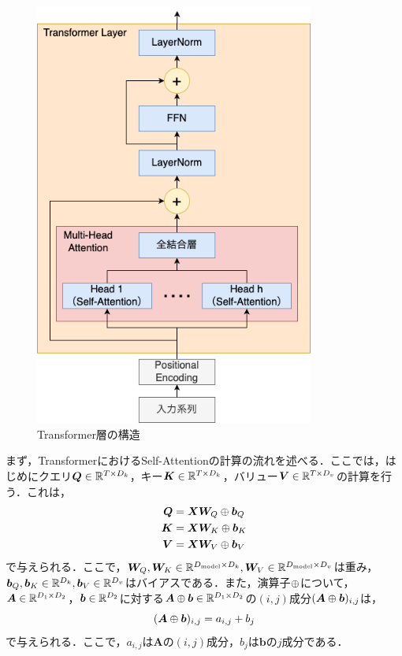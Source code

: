 \documentclass[12pt]{jarticle}
\numberwithin{equation}{section}    %
\numberwithin{figure}{section}      %
\numberwithin{table}{section}      %
\begin{document}
\begin{figure}[bt]
    \centering
    \includegraphics[height=140mm]{./figure/sec3/transformer.drawio.png}
    \caption{Transformer層の構造}
    \label{sec3:fig:transformer_layer}
\end{figure}

まず，TransformerにおけるSelf-Attentionの計算の流れを述べる．ここでは，はじめにクエリ$\bm{Q} \in \mathbb{R}^{T \times D_{k}}$，キー$\bm{K} \in \mathbb{R}^{T \times D_{k}}$，バリュー$\bm{V} \in \mathbb{R}^{T \times D_{v}}$の計算を行う．これは，
\begin{align}
    \bm{Q} & = \bm{X}\bm{W}_{Q} \oplus \bm{b}_{Q} \\
    \bm{K} & = \bm{X}\bm{W}_{K} \oplus \bm{b}_{K} \\
    \bm{V} & = \bm{X}\bm{W}_{V} \oplus \bm{b}_{V}
\end{align}
で与えられる．ここで，$\bm{W}_{Q}, \bm{W}_{K} \in \mathbb{R}^{D_{\text{model}} \times D_{k}}, \bm{W}_{V} \in \mathbb{R}^{D_{\text{model}} \times D_{v}}$は重み，$\bm{b}_{Q}, \bm{b}_{K} \in \mathbb{R}^{D_{k}}, \bm{b}_{V} \in \mathbb{R}^{D_{v}}$はバイアスである．また，演算子$\oplus$について，$\bm{A} \in \mathbb{R}^{D_{1} \times D_{2}}$，$\bm{b} \in \mathbb{R}^{D_{2}}$に対する$\bm{A} \oplus \bm{b} \in \mathbb{R}^{D_{1} \times D_{2}}$の$(i, j)$成分$(\bm{A} \oplus \bm{b})_{i, j}$は，
\begin{equation}
    (\bm{A} \oplus \bm{b})_{i, j} = a_{i, j} + b_{j}
\end{equation}
で与えられる．ここで，$a_{i, j}$は$\bm{A}$の$(i, j)$成分，$b_{j}$は$\bm{b}$の$j$成分である．
\end{document}

